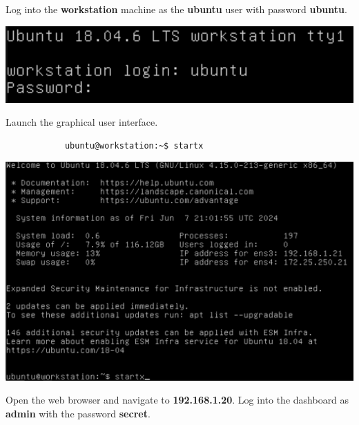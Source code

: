 \documentclass[letterpaper, 12pt]{article}
\begin{document}
\begin{enumerate}
    \begin{labstep}
        Log into the \textbf{workstation} machine as the \textbf{ubuntu} user with password \textbf{ubuntu}.

        \begin{center}
            \includegraphics[width=\linewidth]{images/part1/step1.png}
        \end{center}
    \end{labstep}

    \begin{labstep}
        Launch the graphical user interface.
        \begin{lstlisting}
            ubuntu@workstation:~$ startx
        \end{lstlisting}

        \begin{center}
            \includegraphics[width=\linewidth]{images/part1/step2.png}
        \end{center}
    \end{labstep}

    \begin{labstep}
        Open the web browser and navigate to \textbf{192.168.1.20}.
        Log into the dashboard as \textbf{admin} with the password \textbf{secret}.


\end{labstep}
\end{enumerate}
\end{document}

